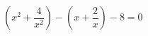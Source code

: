 \begin{ex}[type=equation]
	\begin{condition}
		\( \left( x^2+\dfrac{4}{x^2} \right)-\left( x+\dfrac{2}{x} \right)-8=0 \)
	\end{condition}
\end{ex}